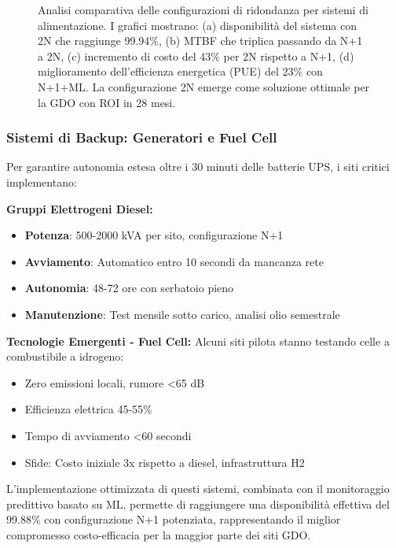 \begin{figure}[htbp]
\centering

\centering
\caption{Analisi comparativa delle configurazioni di ridondanza per sistemi di alimentazione. I grafici mostrano: (a) disponibilità del sistema con 2N che raggiunge 99.94\%, (b) MTBF che triplica passando da N+1 a 2N, (c) incremento di costo del 43\% per 2N rispetto a N+1, (d) miglioramento dell'efficienza energetica (PUE) del 23\% con N+1+ML. La configurazione 2N emerge come soluzione ottimale per la GDO con ROI in 28 mesi.}
\label{fig:power_metrics_comparison}
\end{figure}

\subsubsection{Sistemi di Backup: Generatori e Fuel Cell}

Per garantire autonomia estesa oltre i 30 minuti delle batterie UPS, i siti critici implementano:

\textbf{Gruppi Elettrogeni Diesel:}
\begin{itemize}
    \item \textbf{Potenza}: 500-2000 kVA per sito, configurazione N+1
    \item \textbf{Avviamento}: Automatico entro 10 secondi da mancanza rete
    \item \textbf{Autonomia}: 48-72 ore con serbatoio pieno
    \item \textbf{Manutenzione}: Test mensile sotto carico, analisi olio semestrale
\end{itemize}

\textbf{Tecnologie Emergenti - Fuel Cell:}
Alcuni siti pilota stanno testando celle a combustibile a idrogeno:
\begin{itemize}
    \item Zero emissioni locali, rumore <65 dB
    \item Efficienza elettrica 45-55\%
    \item Tempo di avviamento <60 secondi
    \item Sfide: Costo iniziale 3x rispetto a diesel, infrastruttura H2
\end{itemize}

L'implementazione ottimizzata di questi sistemi, combinata con il monitoraggio predittivo basato su ML, permette di raggiungere una disponibilità effettiva del 99.88\% con configurazione N+1 potenziata, rappresentando il miglior compromesso costo-efficacia per la maggior parte dei siti GDO.
